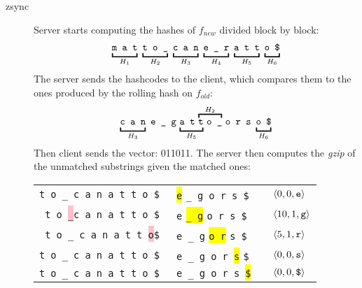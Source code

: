 \begin{description}
  \item[zsync] Server starts computing the hashes of $f_{new}$ divided block by
  block:
  \begin{align*}
    \underbracket{\vphantom{\tt g}\texttt{m a t}}_{H_1}\
    \underbracket{\vphantom{\tt g}\texttt{t o \_}}_{H_2}\
    \underbracket{\vphantom{\tt g}\texttt{c a n}}_{H_3}\
    \underbracket{\vphantom{\tt g}\texttt{e \_ r}}_{H_4}\
    \underbracket{\vphantom{\tt g}\texttt{a t t}}_{H_5}\
    \underbracket{\vphantom{\tt g}\texttt{o \$}}_{H_6}
  \end{align*}
  The server sends the hashcodes to the client, which compares them to the ones
  produced by the rolling hash on $f_{old}$:
  \begin{align*}
    \underbracket{\vphantom{\tt g}\texttt{c a n}}_{H_3}\
    \texttt{e \_ g}\
    \mathrlap{\underbracket{\vphantom{\tt g}\phantom{\texttt{a t}\
    \texttt{t}}}_{H_5}}
    \texttt{a t}\
    \mathrlap{\overbracket{\vphantom{\tt l}\phantom{\texttt{t}\
    \texttt{o \_}}}^{H_2}}
    \texttt{t}\ \texttt{o \_}\
    \texttt{o r s}\
    \underbracket{\vphantom{\tt g}\texttt{o \$}}_{H_6}
  \end{align*}
  Then client sends the vector: 011011. The server then computes the \emph{gzip}
  of the unmatched substrings given the matched ones:
  \begin{table}[H]
    \centering
    \begin{tabular}{r|lcl}
    \tt{t o \_ c a n a t t o \$} & \colorbox{yellow}{\tt e}
    {\tt \_ g o r s \$} & &
    $\langle 0, 0, \text{\tt e} \rangle$ \\
    \tt{t o} \colorbox{pink}{\_}{\tt c a n a t t o \$} & {\tt e}
    \colorbox{yellow}{\tt \_ g} {\tt o r s \$} & &
    $\langle 10, 1, \text{\tt g} \rangle$ \\
    \tt{t o \_ c a n a t t} \colorbox{pink}{o}{\tt \$} & {\tt e \_ g}
    \colorbox{yellow}{\tt o r} {\tt s \$} & &
    $\langle 5, 1, \text{\tt r} \rangle$ \\
    \tt{t o \_ c a n a t t o \$} & {\tt e \_ g o r }\colorbox{yellow}{\tt s}
    {\tt \$} & & $\langle 0, 0, \text{\tt s} \rangle$ \\
    \tt{t o \_ c a n a t t o \$} & {\tt e \_ g o r s }\colorbox{yellow}{\tt \$}
    & & $\langle 0, 0, \text{\tt \$} \rangle$ \\
    \end{tabular}
  \end{table}

\end{description}
